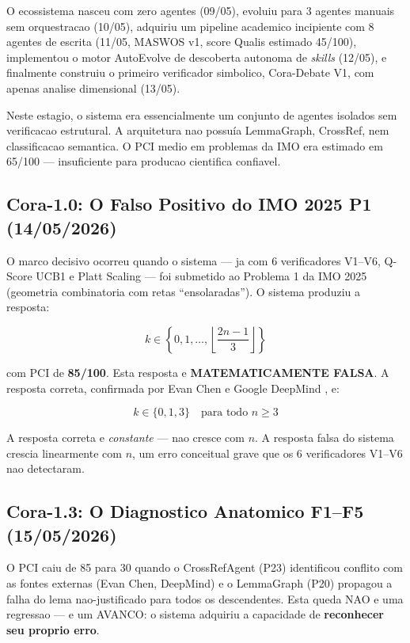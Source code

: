 \documentclass[5p]{elsarticle}
\begin{document}
O ecossistema nasceu com zero agentes (09/05), evoluiu para 3 agentes manuais sem
orquestracao (10/05), adquiriu um pipeline academico incipiente com 8 agentes de
escrita (11/05, MASWOS v1, score Qualis estimado 45/100), implementou o motor
AutoEvolve de descoberta autonoma de \textit{skills} (12/05), e finalmente
construiu o primeiro verificador simbolico, Cora-Debate V1, com apenas analise
dimensional (13/05).

Neste estagio, o sistema era essencialmente um conjunto de agentes isolados sem
verificacao estrutural. A arquitetura nao possuía LemmaGraph, CrossRef, nem
classificacao semantica. O PCI medio em problemas da IMO era estimado em 65/100
--- insuficiente para producao cientifica confiavel.

\subsection{Cora-1.0: O Falso Positivo do IMO 2025 P1 (14/05/2026)}

O marco decisivo ocorreu quando o sistema --- ja com 6 verificadores V1--V6,
Q-Score UCB1 e Platt Scaling --- foi submetido ao Problema 1 da IMO 2025
(geometria combinatoria com retas ``ensolaradas''). O sistema produziu a resposta:

\begin{equation}
k \in \left\{0, 1, \ldots, \left\lfloor\frac{2n-1}{3}\right\rfloor\right\}
\label{eq:falsa}
\end{equation}

com PCI de \textbf{85/100}. Esta resposta e \textbf{MATEMATICAMENTE FALSA}.
A resposta correta, confirmada por Evan Chen \cite{chen2020imo} e Google DeepMind
\cite{deepmind2025imo}, e:

\begin{equation}
k \in \{0, 1, 3\} \quad \text{para todo } n \geq 3
\label{eq:correta}
\end{equation}

A resposta correta e \textit{constante} --- nao cresce com $n$. A resposta falsa
do sistema crescia linearmente com $n$, um erro conceitual grave que os 6
verificadores V1--V6 nao detectaram.

\subsection{Cora-1.3: O Diagnostico Anatomico F1--F5 (15/05/2026)}

O PCI caiu de 85 para 30 quando o CrossRefAgent (P23) identificou conflito com as
fontes externas (Evan Chen, DeepMind) e o LemmaGraph (P20) propagou a falha do lema
nao-justificado para todos os descendentes. Esta queda NAO e uma regressao --- e
um AVANCO: o sistema adquiriu a capacidade de \textbf{reconhecer seu proprio erro}.
\end{document}

